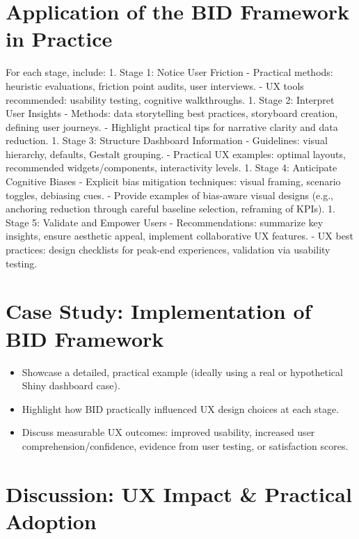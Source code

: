 \documentclass[
  authoryear,
  preprint]{elsarticle}
\providecommand{\tightlist}{%
  \setlength{\itemsep}{0pt}\setlength{\parskip}{0pt}}\usepackage{longtable,booktabs,array}
\begin{document}
\section{Application of the BID Framework in
Practice}\label{application-of-the-bid-framework-in-practice}

For each stage, include: 1. Stage 1: Notice User Friction - Practical
methods: heuristic evaluations, friction point audits, user interviews.
- UX tools recommended: usability testing, cognitive walkthroughs. 1.
Stage 2: Interpret User Insights - Methods: data storytelling best
practices, storyboard creation, defining user journeys. - Highlight
practical tips for narrative clarity and data reduction. 1. Stage 3:
Structure Dashboard Information - Guidelines: visual hierarchy,
defaults, Gestalt grouping. - Practical UX examples: optimal layouts,
recommended widgets/components, interactivity levels. 1. Stage 4:
Anticipate Cognitive Biases - Explicit bias mitigation techniques:
visual framing, scenario toggles, debiasing cues. - Provide examples of
bias-aware visual designs (e.g., anchoring reduction through careful
baseline selection, reframing of KPIs). 1. Stage 5: Validate and Empower
Users - Recommendations: summarize key insights, ensure aesthetic
appeal, implement collaborative UX features. - UX best practices: design
checklists for peak-end experiences, validation via usability testing.

\section{Case Study: Implementation of BID
Framework}\label{case-study-implementation-of-bid-framework}

\begin{itemize}
\tightlist
\item
  Showcase a detailed, practical example (ideally using a real or
  hypothetical Shiny dashboard case).
\item
  Highlight how BID practically influenced UX design choices at each
  stage.
\item
  Discuss measurable UX outcomes: improved usability, increased user
  comprehension/confidence, evidence from user testing, or satisfaction
  scores.
\end{itemize}

\section{Discussion: UX Impact \& Practical
Adoption}\label{discussion-ux-impact-practical-adoption}
\end{document}
